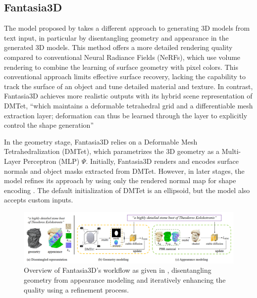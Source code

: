\subsection{Fantasia3D}\label{fantasia3D}

The model proposed by \citeauthor{chen2023fantasia3d} takes a different approach to generating 3D models from text input, in particular by disentangling geometry and appearance in the generated 3D models.
This method offers a more detailed rendering quality compared to conventional Neural Radiance Fields (NeRFs), which use volume rendering to combine the learning of surface geometry with pixel colors. This conventional approach limits effective surface recovery, lacking the capability to track the surface of an object and tune detailed material and texture. In contrast, Fantasia3D achieves more realistic outputs with its hybrid scene representation of DMTet, ``which maintains a deformable tetrahedral grid and a differentiable mesh extraction layer; deformation can thus be learned through the layer to explicitly control the shape generation'' \citep{chen2023fantasia3d}

In the geometry stage, Fantasia3D relies on a Deformable Mesh Tetrahedralization (DMTet), which parametrizes the 3D geometry as a Multi-Layer Perceptron (MLP) \(\Psi\). Initially, Fantasia3D renders and encodes surface normals and object masks extracted from DMTet. However, in later stages, the model refines its approach by using only the rendered normal map for shape encoding \citep{chen2023fantasia3d}. The default initialization of DMTet is an ellipsoid, but the model also accepts custom inputs.

\begin{figure}[ht]
  \centering
    \includegraphics[width=1\columnwidth]{figures/Fantasia3D.png}
    \caption{Overview of Fantasia3D's workflow as given in \citep{chen2023fantasia3d}, disentangling geometry from appearance modeling and iteratively enhancing the quality using a refinement process.}\label{fig:figureFantasia}
\end{figure}

